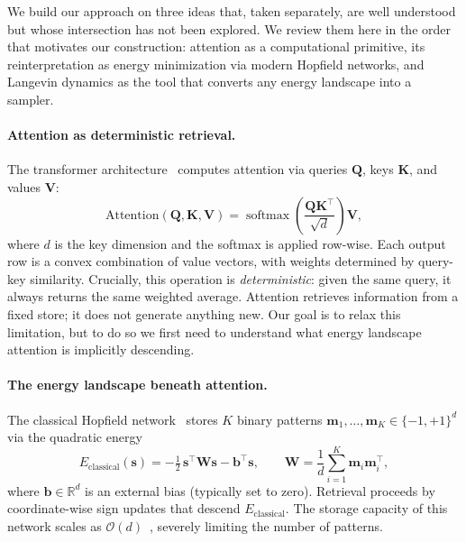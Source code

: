
We build our approach on three ideas that, taken separately, are well understood but whose intersection has not been explored. We review them here in the order that motivates our construction: attention as a computational primitive, its reinterpretation as energy minimization via modern Hopfield networks, and Langevin dynamics as the tool that converts any energy landscape into a sampler.

\paragraph{Attention as deterministic retrieval.}
The transformer architecture~\cite{vaswaniAttentionAllYou2017} computes attention via queries $\mathbf{Q}$, keys $\mathbf{K}$, and values $\mathbf{V}$:
\begin{equation}\label{eq:sdp-attention}
    \mathrm{Attention}(\mathbf{Q},\mathbf{K},\mathbf{V})
    = \operatorname{softmax}\!\left(\frac{\mathbf{Q}\mathbf{K}^{\top}}{\sqrt{d}}\right)\mathbf{V},
\end{equation}
where $d$ is the key dimension and the softmax is applied row-wise. Each output row is a convex combination of value vectors, with weights determined by query-key similarity.
Crucially, this operation is \emph{deterministic}: given the same query, it always returns the same weighted average. Attention retrieves information from a fixed store; it does not generate anything new. Our goal is to relax this limitation, but to do so we first need to understand what energy landscape attention is implicitly descending.

\paragraph{The energy landscape beneath attention.}
The classical Hopfield network~\cite{hopfieldNeuralNetworksPhysical1982} stores $K$ binary patterns $\mathbf{m}_1,\dots,\mathbf{m}_K\in\{-1,+1\}^d$ via the quadratic energy
\begin{equation}\label{eq:classical-hopfield}
    E_{\mathrm{classical}}(\mathbf{s})
    = -\tfrac{1}{2}\,\mathbf{s}^{\top}\mathbf{W}\mathbf{s}
      - \mathbf{b}^{\top}\mathbf{s},
    \qquad
    \mathbf{W} = \frac{1}{d}\sum_{i=1}^{K}\mathbf{m}_i\mathbf{m}_i^{\top},
\end{equation}
where $\mathbf{b}\in\mathbb{R}^d$ is an external bias (typically set to zero). Retrieval proceeds by coordinate-wise sign updates that descend $E_{\mathrm{classical}}$. The storage capacity of this network scales as $\mathcal{O}(d)$~\cite{amitStoringInfiniteNumbers1985}, severely limiting the number of patterns.


